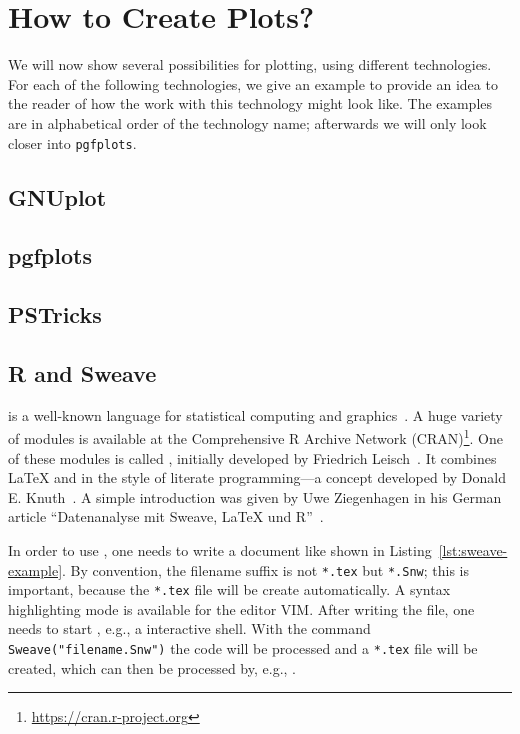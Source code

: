 \section{How to Create Plots?}

We will now show several possibilities for plotting, using different
technologies. For each of the following technologies, we give an example to
provide an idea to the reader of how the work with this technology might look
like. The examples are in alphabetical order of the technology name; afterwards
we will only look closer into \texttt{pgfplots}.

\subsection{GNUplot}

\subsection{pgfplots}

\subsection{PSTricks}

\subsection{R and Sweave}

 is a well-known language for statistical computing and
graphics~\cite{Ihaka1998}.  A huge variety of modules is available at the
Comprehensive R Archive Network (CRAN)\footnote{%
  \href{https://cran.r-project.org}{https://cran.r-project.org}}.  One of these
modules is called , initially developed by Friedrich
Leisch~\cite{Leisch2002}.  It combines \LaTeX{} and  in the style of
literate programming—a concept developed by Donald E\@. Knuth~\cite{Knuth1992}.
A simple introduction was given by Uwe Ziegenhagen in his German article
\enquote{Datenanalyse mit Sweave, \LaTeX{} und R}~\cite{Ziegenhagen2010}.

In order to use , one needs to write a document like shown in
Listing~\ref{lst:sweave-example}.  By convention, the filename suffix is not
\texttt{*.tex} but \texttt{*.Snw}; this is important, because the \texttt{*.tex}
file will be create automatically.  A syntax highlighting mode is available for
the editor VIM\@.  After writing the file, one needs to start ,
e.g., a  interactive shell.  With the command
\texttt{Sweave("filename.Snw")} the  code will be processed
and a \texttt{*.tex} file will be created, which can then be processed by, e.g.,
.

